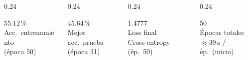 \documentclass[final]{beamer}
\begin{document}
\begin{frame}[t]{}
\begin{columns}[c,totalwidth=\linewidth]
  \begin{column}{0.24\linewidth}
    \begin{tcolorbox}[metricbox=traincolor, height=3.0cm]
      {\fontsize{33}{36}\selectfont\textcolor{traincolor}{55.12\,\%}}\\[2pt]
      {\large Acc.\ entrenamiento}\\{\small (\'epoca 50)}
    \end{tcolorbox}
  \end{column}
  \begin{column}{0.24\linewidth}
    \begin{tcolorbox}[metricbox=testcolor, height=3.0cm]
      {\fontsize{33}{36}\selectfont\textcolor{testcolor}{45.64\,\%}}\\[2pt]
      {\large Mejor acc.\ prueba}\\{\small (\'epoca 31)}
    \end{tcolorbox}
  \end{column}
  \begin{column}{0.24\linewidth}
    \begin{tcolorbox}[metricbox=losscolor, height=3.0cm]
      {\fontsize{33}{36}\selectfont\textcolor{losscolor}{1.4777}}\\[2pt]
      {\large Loss final}\\{\small Cross-entropy (\'ep.\ 50)}
    \end{tcolorbox}
  \end{column}
  \begin{column}{0.24\linewidth}
    \begin{tcolorbox}[metricbox=accentgold, height=3.0cm]
      {\fontsize{33}{36}\selectfont\textcolor{accentgold!80!black}{50}}\\[2pt]
      {\large \'Epocas totales}\\{\small $\approx$39\,s / \'ep.\ (inicio)}
    \end{tcolorbox}
  \end{column}
\end{columns}

\vspace{6pt}

\begin{tcolorbox}[sectionbox, title={$\sim$ Curvas de Entrenamiento --- CNN 2-D (50 \'epocas)}]
\begin{columns}[c]


\end{columns}
\end{tcolorbox}
\end{frame}
\end{document}
